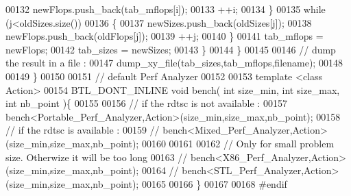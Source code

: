 \begin{DoxyCode}
00132         newFlops.push\_back(tab\_mflops[i]);
00133         ++i;
00134       \}
00135       \textcolor{keywordflow}{while} (j<oldSizes.size())
00136       \{
00137         newSizes.push\_back(oldSizes[j]);
00138         newFlops.push\_back(oldFlops[j]);
00139         ++j;
00140       \}
00141       tab\_mflops = newFlops;
00142       tab\_sizes = newSizes;
00143     \}
00144   \}
00145 
00146   \textcolor{comment}{// dump the result in a file  :}
00147   dump\_xy\_file(tab\_sizes,tab\_mflops,filename);
00148 
00149 \}
00150 
00151 \textcolor{comment}{// default Perf Analyzer}
00152 
00153 \textcolor{keyword}{template} <\textcolor{keyword}{class} Action>
00154 BTL\_DONT\_INLINE \textcolor{keywordtype}{void} bench( \textcolor{keywordtype}{int} size\_min, \textcolor{keywordtype}{int} size\_max, \textcolor{keywordtype}{int} nb\_point )\{
00155 
00156   \textcolor{comment}{// if the rdtsc is not available :}
00157   bench<Portable\_Perf\_Analyzer,Action>(size\_min,size\_max,nb\_point);
00158   \textcolor{comment}{// if the rdtsc is available :}
00159 \textcolor{comment}{//    bench<Mixed\_Perf\_Analyzer,Action>(size\_min,size\_max,nb\_point);}
00160 
00161 
00162   \textcolor{comment}{// Only for small problem size. Otherwize it will be too long}
00163 \textcolor{comment}{//   bench<X86\_Perf\_Analyzer,Action>(size\_min,size\_max,nb\_point);}
00164 \textcolor{comment}{//   bench<STL\_Perf\_Analyzer,Action>(size\_min,size\_max,nb\_point);}
00165 
00166 \}
00167 
00168 \textcolor{preprocessor}{#endif}
\end{DoxyCode}
